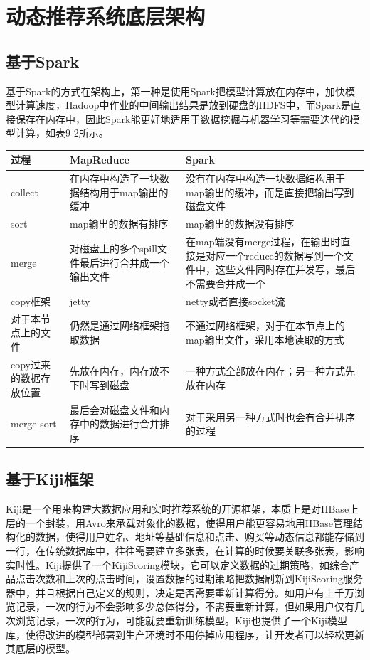   \section{动态推荐系统底层架构}
    \subsection{基于Spark}
    基于Spark的方式在架构上，第一种是使用Spark把模型计算放在内存中，加快模型计算速度，Hadoop中作业的中间输出结果是放到硬盘的HDFS中，而Spark是直接保存在内存中，因此Spark能更好地适用于数据挖掘与机器学习等需要迭代的模型计算，如表9-2所示。
    \begin{table}[htp]
    \centering
    \label{tab:spark}
    \begin{tabular}{ |p{3cm}|p{5cm}|p{5cm}| } \hline
     过程 & MapReduce & Spark \\ \hline
     collect & 在内存中构造了一块数据结构用于map输出的缓冲 & 没有在内存中构造一块数据结构用于map输出的缓冲，而是直接把输出写到磁盘文件 \\ \hline
     sort & map输出的数据有排序 & map输出的数据没有排序 \\ \hline
     merge & 对磁盘上的多个spill文件最后进行合并成一个输出文件 & 在map端没有merge过程，在输出时直接是对应一个reduce的数据写到一个文件中，这些文件同时存在并发写，最后不需要合并成一个 \\ \hline
     copy框架 & jetty & netty或者直接socket流 \\ \hline
     对于本节点上的文件 & 仍然是通过网络框架拖取数据 & 不通过网络框架，对于在本节点上的map输出文件，采用本地读取的方式\\ \hline
     copy过来的数据存放位置 & 先放在内存，内存放不下时写到磁盘 & 一种方式全部放在内存；另一种方式先放在内存\\ \hline
     merge sort & 最后会对磁盘文件和内存中的数据进行合并排序 & 对于采用另一种方式时也会有合并排序的过程\\ \hline
    \end{tabular}
    \end{table}

    \subsection{基于Kiji框架}
    Kiji是一个用来构建大数据应用和实时推荐系统的开源框架，本质上是对HBase上层的一个封装，用Avro来承载对象化的数据，使得用户能更容易地用HBase管理结构化的数据，使得用户姓名、地址等基础信息和点击、购买等动态信息都能存储到一行，在传统数据库中，往往需要建立多张表，在计算的时候要关联多张表，影响实时性。Kiji提供了一个KijiScoring模块，它可以定义数据的过期策略，如综合产品点击次数和上次的点击时间，设置数据的过期策略把数据刷新到KijiScoring服务器中，并且根据自己定义的规则，决定是否需要重新计算得分。如用户有上千万浏览记录，一次的行为不会影响多少总体得分，不需要重新计算，但如果用户仅有几次浏览记录，一次的行为，可能就要重新训练模型。Kiji也提供了一个Kiji模型库，使得改进的模型部署到生产环境时不用停掉应用程序，让开发者可以轻松更新其底层的模型。

